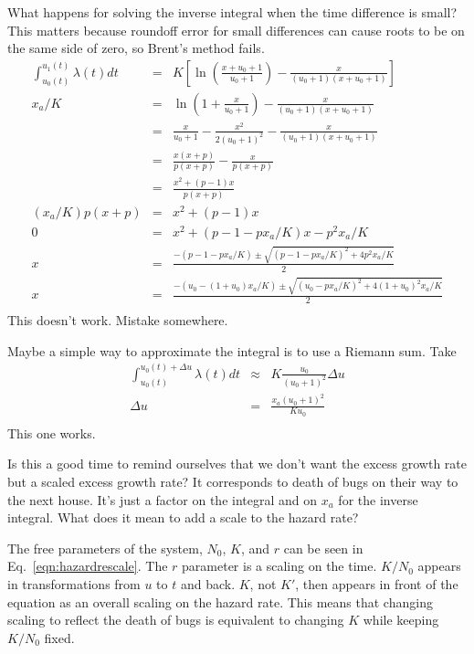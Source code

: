 \documentclass{article}
\begin{document}
What happens for solving the inverse integral when the time difference
is small? This matters because roundoff error for small differences
can cause roots to be on the same side of zero, so Brent's method fails.
\begin{eqnarray}
  \int_{u_0(t)}^{u_1(t)}\lambda(t)dt& =& K\left[
    \ln\left(\frac{x+u_0+1}{u_0+1}\right)-\frac{x}{(u_0+1)(x+u_0+1)}
    \right] \\
  x_a/K & = & \ln\left(1+\frac{x}{u_0+1}\right)-\frac{x}{(u_0+1)(x+u_0+1)} \\
  & = & \frac{x}{u_0+1}-\frac{x^2}{2(u_0+1)^2}-\frac{x}{(u_0+1)(x+u_0+1)} \\
  & = & \frac{x(x+p)}{p(x+p)}-\frac{x}{p(x+p)} \\
  & = & \frac{x^2 +(p-1)x}{p(x+p)} \\
  (x_a/K)p(x+p) & =&  x^2 +(p-1)x \\
  0 & = & x^2 + (p-1-px_a/K)x - p^2x_a/K \\
  x & = & \frac{-(p-1-px_a/K)\pm\sqrt{(p-1-px_a/K)^2+4p^2x_a/K}}{2} \\
  x & = & \frac{-(u_0-(1+u_0)x_a/K)\pm\sqrt{(u_0-px_a/K)^2+4(1+u_0)^2x_a/K}}{2} \\
\end{eqnarray}
This doesn't work. Mistake somewhere.


Maybe a simple way to approximate the integral is
to use a Riemann sum. Take
\begin{eqnarray}
  \int_{u_0(t)}^{u_0(t)+\Delta u}\lambda(t)dt& \approx& K\frac{u_0}{(u_0+1)^2}
      \Delta u \\
  \Delta u&=& \frac{x_a(u_0+1)^2}{Ku_0} \\
\end{eqnarray}
This one works.


Is this a good time to remind ourselves that we don't want the
excess growth rate but a scaled excess growth rate? It corresponds
to death of bugs on their way to the next house. It's just a factor
on the integral and on $x_a$ for the inverse integral.
What does it mean to add a scale to the hazard rate?

The free parameters of the system, $N_0$, $K$, and $r$
can be seen in Eq.~\ref{eqn:hazardrescale}. The
$r$ parameter is a scaling on the time. $K/N_0$
appears in transformations from $u$ to $t$ and back.
$K$, not $K'$, then appears in front of the equation as an overall
scaling on the hazard rate. This means that changing scaling
to reflect the death of bugs is equivalent to changing
$K$ while keeping $K/N_0$ fixed.
\end{document}

